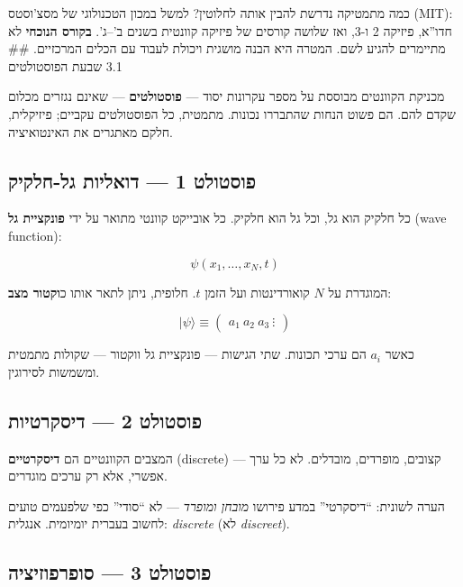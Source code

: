 \documentclass[
  hebrew,
  letterpaper,
  DIV=11,
  numbers=noendperiod]{scrreprt}
\begin{document}
כמה מתמטיקה נדרשת להבין אותה לחלוטין? למשל במכון הטכנולוגי של מסצ'וסטס
(MIT): חדו''א, פיזיקה 2 ו-3, ואז שלושה קורסים של פיזיקה קוונטית בשנים
ב'--ג'. \textbf{בקורס הנוכחי} לא מתיימרים להגיע לשם. המטרה היא הבנה
מושגית ויכולת לעבוד עם הכלים המרכזיים. \#\# 3.1 שבעת הפוסטולטים

מכניקת הקוונטים מבוססת על מספר עקרונות יסוד --- \textbf{פוסטולטים} ---
שאינם נגזרים מכלום שקדם להם. הם פשוט הנחות שהתבררו נכונות. מתמטית, כל
הפוסטולטים עקביים; פיזיקלית, חלקם מאתגרים את האינטואיציה.

\subsection{פוסטולט 1 --- דואליות
גל-חלקיק}\label{ux5e4ux5d5ux5e1ux5d8ux5d5ux5dcux5d8-1-ux5d3ux5d5ux5d0ux5dcux5d9ux5d5ux5ea-ux5d2ux5dc-ux5d7ux5dcux5e7ux5d9ux5e7}

כל חלקיק הוא גל, וכל גל הוא חלקיק. כל אובייקט קוונטי מתואר על ידי
\textbf{פונקציית גל} (wave function):

\[\psi(x_1, \ldots, x_N, t)\]

המוגדרת על \(N\) קואורדינטות ועל הזמן \(t\). חלופית, ניתן לתאר אותו
כ\textbf{וקטור מצב}:

\[|\psi\rangle \equiv \begin{pmatrix} a_1 \ a_2 \ a_3 \ \vdots \end{pmatrix}\]

כאשר \(a_i\) הם ערכי תכונות. שתי הגישות --- פונקציית גל ווקטור ---
שקולות מתמטית ומשמשות לסירוגין.

\subsection{פוסטולט 2 ---
דיסקרטיות}\label{ux5e4ux5d5ux5e1ux5d8ux5d5ux5dcux5d8-2-ux5d3ux5d9ux5e1ux5e7ux5e8ux5d8ux5d9ux5d5ux5ea}

המצבים הקוונטיים הם \textbf{דיסקרטיים} (discrete) --- קצובים, מופרדים,
מובדלים. לא כל ערך אפשרי, אלא רק ערכים מוגדרים.

הערה לשונית: ``דיסקרטי'' במדע פירושו \emph{מובחן ומופרד} --- לא ``סודי''
כפי שלפעמים טועים לחשוב בעברית יומיומית. אנגלית: \emph{discrete} (לא
\emph{discreet}).

\subsection{פוסטולט 3 ---
סופרפוזיציה}\label{ux5e4ux5d5ux5e1ux5d8ux5d5ux5dcux5d8-3-ux5e1ux5d5ux5e4ux5e8ux5e4ux5d5ux5d6ux5d9ux5e6ux5d9ux5d4}
\end{document}
